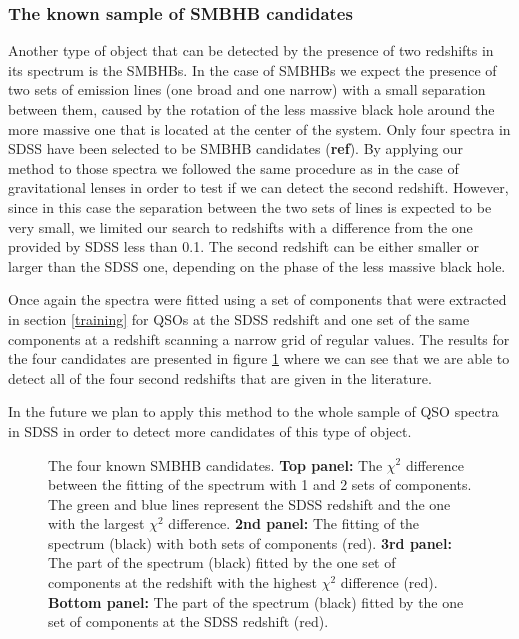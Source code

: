 \documentclass[apj]{emulateapj}
\begin{document}
\subsubsection{The known sample of SMBHB candidates}\label{smbhb}
Another type of object that can be detected by the presence of two redshifts in its spectrum is the SMBHBs. In the case of SMBHBs we expect the presence of two sets of emission lines (one broad and one narrow) with a small separation between them, caused by the rotation of the less massive black hole around the more massive one that is located at the center of the system. Only four spectra in SDSS have been selected to be SMBHB candidates (\textbf{ref}). By applying our method to those spectra we followed the same procedure as in the case of gravitational lenses in order to test if we can detect the second redshift. However, since in this case the separation between the two sets of lines is expected to be very small, we limited our search to redshifts with a difference from the one provided by SDSS less than 0.1. The second redshift can be either smaller or larger than the SDSS one, depending on the phase of the less massive black hole.

Once again the spectra were fitted using a set of components that were extracted in section \ref{training} for QSOs at the SDSS redshift and one set of the same components at a redshift scanning a narrow grid of regular values. The results for the four candidates are presented in figure \ref{f6a} where we can see that we are able to detect all of the four second redshifts that are given in the literature.

In the future we plan to apply this method to the whole sample of QSO spectra in SDSS in order to detect more candidates of this type of object.

\begin{figure}[h]
\caption{The four known SMBHB candidates. \textbf{Top panel:} The $\chi^2$ difference between the fitting of the spectrum with 1 and 2 sets of components. The green and blue lines represent the SDSS redshift and the one with the largest $\chi^2$ difference. \textbf{2nd panel:} The fitting of the spectrum (black) with both sets of components (red). \textbf{3rd panel:} The part of the spectrum (black) fitted by the one set of components at the redshift with the highest $\chi^2$ difference (red). \textbf{Bottom panel:} The part of the spectrum (black) fitted by the one set of components at the SDSS redshift (red).}
\label{f6a}
\end{figure}
\end{document}
